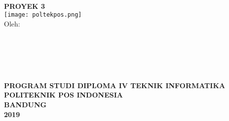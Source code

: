 \begin{titlepage}
\begin{center}

\begin{doublespace}
\textbf{\smaller\large{\MakeUppercase{\judul}}}\\[2.5cm]
\end{doublespace}
\textbf{\MakeUppercase{\large proyek 3}}\\[1cm]

\texttt{[image: poltekpos.png]}\\[1cm]   
\large Oleh: \\
\begin{onehalfspace}
\large{\penulissatu} \\
\large{\nimsatu}\\
\large{\penulisdua} \\
\large{\nimdua}\\[2.5cm]
\end{onehalfspace}

\vfill

\textbf{\large \MakeUppercase{program studi diploma iv teknik informatika}}\\
\textbf{\large \MakeUppercase{politeknik pos indonesia}}\\
\textbf{\large \MakeUppercase{bandung}}\\
\textbf{\large 2019}\\
\end{center}
\end{titlepage}
